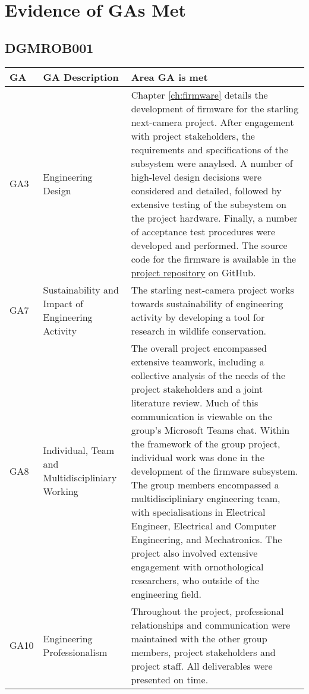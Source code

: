 \documentclass[class=report,11pt,crop=false]{standalone}
\begin{document}
\ifstandalone
\tableofcontents
\fi


\chapter{Evidence of GAs Met}

\section{DGMROB001}

\centering
\begin{tabularx}{\textwidth}{|p{} p{} X|}

    \hline
    \textbf{GA} & \textbf{GA Description} & \textbf{Area GA is met} \\ \hline

    GA3 & Engineering Design & Chapter \ref{ch:firmware} details the development of firmware for the starling next-camera project. After engagement with project stakeholders, the requirements and specifications of the subsystem were anaylsed. A number of high-level design decisions were considered and detailed, followed by extensive testing of the subsystem on the project hardware. Finally, a number of acceptance test procedures were developed and performed. The source code for the firmware is available in the \href{https://github.com/rothdu/EEE4113F-Group13-2024}{project repository} on GitHub. \\ \hline

    GA7 & Sustainability and Impact of Engineering Activity & The starling nest-camera project works towards sustainability of engineering activity by developing a tool for research in wildlife conservation. \\ \hline

    GA8 & Individual, Team and Multidiscipliniary Working & The overall project encompassed extensive teamwork, including a collective analysis of the needs of the project stakeholders and a joint literature review. Much of this communication is viewable on the group's Microsoft Teams chat. Within the framework of the group project, individual work was done in the development of the firmware subsystem. The group members encompassed a multidiscipliniary engineering team, with specialisations in Electrical Engineer, Electrical and Computer Engineering, and Mechatronics. The project also involved extensive engagement with ornothological researchers, who outside of the engineering field. \\ \hline

    GA10 & Engineering Professionalism & Throughout the project, professional relationships and communication were maintained with the other group members, project stakeholders and project staff. All deliverables were presented on time. \\ \hline


\end{tabularx}
\raggedright
\end{document}
